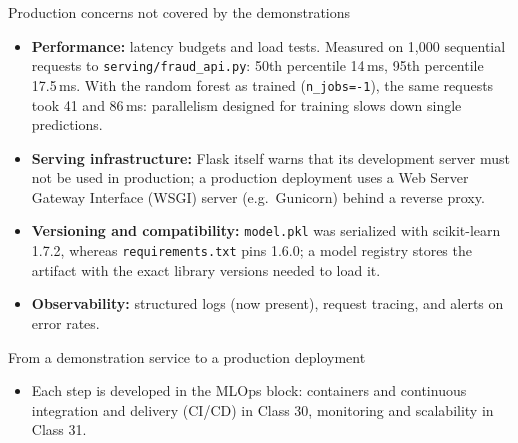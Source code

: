 \begin{frame}{Production concerns not covered by the demonstrations}
\begin{itemize}\small
\item \textbf{Performance:} latency budgets and load tests. Measured on 1{,}000 sequential requests to \texttt{serving/fraud\_api.py}: 50th percentile 14\,ms, 95th percentile 17.5\,ms. With the random forest as trained (\texttt{n\_jobs=-1}), the same requests took 41 and 86\,ms: parallelism designed for training slows down single predictions.
\item \textbf{Serving infrastructure:} Flask itself warns that its development server must not be used in production; a production deployment uses a Web Server Gateway Interface (WSGI) server (e.g.\ Gunicorn) behind a reverse proxy.
\item \textbf{Versioning and compatibility:} \texttt{model.pkl} was serialized with scikit-learn 1.7.2, whereas \texttt{requirements.txt} pins 1.6.0; a model registry stores the artifact with the exact library versions needed to load it.
\item \textbf{Observability:} structured logs (now present), request tracing, and alerts on error rates.
\end{itemize}
\coursefooter
\end{frame}

\begin{frame}{From a demonstration service to a production deployment}
\centering
{}
\vspace{0.6em}
\begin{itemize}
\item Each step is developed in the MLOps block: containers and continuous integration and delivery (CI/CD) in Class 30, monitoring and scalability in Class 31.
\end{itemize}
\coursefooter
\end{frame}

